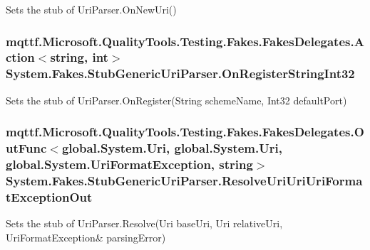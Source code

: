 Sets the stub of Uri\-Parser.\-On\-New\-Uri()

\hypertarget{class_system_1_1_fakes_1_1_stub_generic_uri_parser_a5cdae16d74f3352e12ba29759932b9c6}{
\subsubsection[{On\-Register\-String\-Int32}]{\setlength{\rightskip}{0pt plus 5cm}mqttf.\-Microsoft.\-Quality\-Tools.\-Testing.\-Fakes.\-Fakes\-Delegates.\-Action$<$string, int$>$ System.\-Fakes.\-Stub\-Generic\-Uri\-Parser.\-On\-Register\-String\-Int32}}\label{class_system_1_1_fakes_1_1_stub_generic_uri_parser_a5cdae16d74f3352e12ba29759932b9c6}


Sets the stub of Uri\-Parser.\-On\-Register(\-String scheme\-Name, Int32 default\-Port)

\hypertarget{class_system_1_1_fakes_1_1_stub_generic_uri_parser_a630e68b63eb6c405584e39d45ecba9e3}{
\subsubsection[{Resolve\-Uri\-Uri\-Uri\-Format\-Exception\-Out}]{\setlength{\rightskip}{0pt plus 5cm}mqttf.\-Microsoft.\-Quality\-Tools.\-Testing.\-Fakes.\-Fakes\-Delegates.\-Out\-Func$<$global.\-System.\-Uri, global.\-System.\-Uri, global.\-System.\-Uri\-Format\-Exception, string$>$ System.\-Fakes.\-Stub\-Generic\-Uri\-Parser.\-Resolve\-Uri\-Uri\-Uri\-Format\-Exception\-Out}}\label{class_system_1_1_fakes_1_1_stub_generic_uri_parser_a630e68b63eb6c405584e39d45ecba9e3}


Sets the stub of Uri\-Parser.\-Resolve(Uri base\-Uri, Uri relative\-Uri, Uri\-Format\-Exception\& parsing\-Error)



